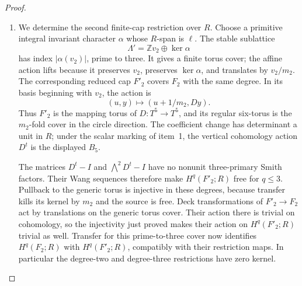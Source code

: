 \begin{proof}
\begin{enumerate}[label={$\langle1\rangle$\arabic*.}]
Set $a_i=\ell(v_i)$.  An arbitrary cusp clutch contributes a scalar
$\delta$ to $g_1+g_2=\delta z$.  The remaining relation matrix is
\[
 \begin{pmatrix}m_1&0&-a_1\\0&m_2&-a_2\\1&1&-\delta\end{pmatrix}.
\]
Its determinant is a unit for a simply connected total space.
Since $3\mid m_2$ and $3\nmid m_1$, reduction modulo three makes
$a_2$ a unit in $R$.  This conclusion includes arbitrary clutch
translations and twists.

\item We determine the second finite-cap restriction over $R$.
Choose a primitive integral invariant character $\alpha$ whose
$R$-span is $\ell$.  The stable sublattice
\[
 \Lambda'=\mathbb Z v_2\oplus\ker\alpha
\]
has index $|\alpha(v_2)|$, prime to three.  It gives a finite torus cover; the affine action lifts because it preserves
$v_2$, preserves $\ker\alpha$, and translates by $v_2/m_2$.
The corresponding reduced cap $F'_2$ covers $F_2$ with the same
degree.  In its basis beginning with $v_2$, the action is
\[
 (u,y)\longmapsto(u+1/m_2,Dy).
\]
Thus $F'_2$ is the mapping torus of $D:T^5\to T^5$, and its
regular six-torus is the $m_2$-fold cover in the circle direction.
The coefficient change has determinant a unit in $R$; under the
scalar marking of item~1, the vertical cohomology action $D^t$
is the displayed $B_5$.

The matrices $D^t-I$ and $\bigwedge^2D^t-I$ have no nonunit
three-primary Smith factors.  Their Wang sequences therefore make
$H^q(F'_2;R)$ free for $q\leq3$.  Pullback to the generic torus
is injective in these degrees, because transfer kills its kernel
by $m_2$ and the source is free.  Deck transformations of
$F'_2\to F_2$ act by translations on the generic torus cover.
Their action there is trivial on cohomology, so the injectivity
just proved makes their action on $H^q(F'_2;R)$ trivial as well.
Transfer for this prime-to-three cover now identifies
$H^q(F_2;R)$ with $H^q(F'_2;R)$, compatibly with their restriction maps.  In particular the degree-two and degree-three
restrictions have zero kernel.


\end{enumerate}
\end{proof}
